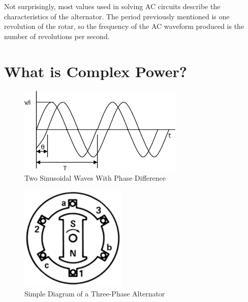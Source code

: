 \documentclass{article}
\begin{document}
  Not surprisingly, most values used in solving \ac{AC} circuits describe the
  characteristics of the alternator.  The period previously mentioned is one
  revolution of the rotar, so the frequency of the \ac{AC} waveform produced is
  the number of revolutions per second.

  \section*{What is Complex Power?}

  \begin{figure}
    \centering
    \includegraphics[width=0.7\textwidth]{acwave}
    \caption{Two Sinusoidal Waves With Phase Difference}
    \label{acwave}
  \end{figure}

  \begin{figure}
    \centering
    \includegraphics[width=0.45\textwidth]{threephasemotor}
    \caption{Simple Diagram of a Three-Phase Alternator}
    \label{alternator}
  \end{figure}
\end{document}
